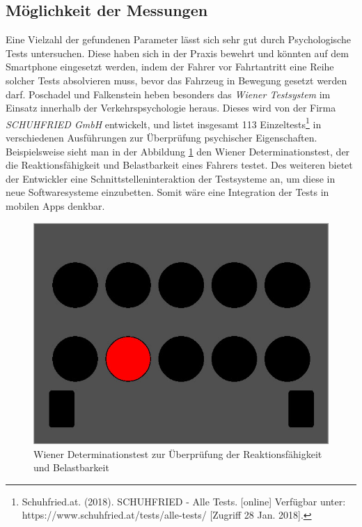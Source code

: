 \subsection{Möglichkeit der Messungen}
Eine Vielzahl der gefundenen Parameter lässt sich sehr gut durch Psychologische Tests untersuchen. Diese haben sich in der Praxis bewehrt und könnten auf dem Smartphone eingesetzt werden, indem der Fahrer vor Fahrtantritt eine Reihe solcher Tests absolvieren muss, bevor das Fahrzeug in Bewegung gesetzt werden darf. Poschadel und Falkenstein \cite{testverfahrenpsychometrischefahreignung} heben besonders das \textit{Wiener Testsystem} im Einsatz innerhalb der Verkehrspsychologie heraus. Dieses wird von der Firma \textit{SCHUHFRIED GmbH} entwickelt, und listet insgesamt 113 Einzeltests\footnote{\label{foot:schuhfriedtests} Schuhfried.at. (2018). SCHUHFRIED - Alle Tests. [online] Verfügbar unter: https://www.schuhfried.at/tests/alle-tests/ [Zugriff 28 Jan. 2018].} in verschiedenen Ausführungen zur Überprüfung psychischer Eigenschaften. Beispielsweise sieht man in der Abbildung \ref{fig:wiener_dt} den Wiener Determinationstest, der die Reaktionsfähigkeit und  Belastbarkeit eines Fahrers testet. Des weiteren bietet der Entwickler eine Schnittstelleninteraktion der Testsysteme an, um diese in neue Softwaresysteme einzubetten. Somit wäre eine Integration der Tests in mobilen Apps denkbar.

\begin{figure}[H]
\centering
\includegraphics[width=0.7\linewidth]{images/wiener_dt}
\caption[Caption for parameters]{Wiener Determinationstest zur Überprüfung der Reaktionsfähigkeit und Belastbarkeit\footnotemark}
\label{fig:wiener_dt}
\end{figure}


